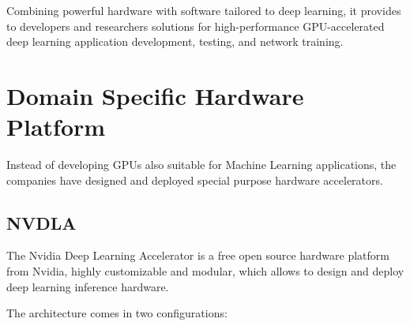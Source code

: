 Combining powerful hardware with software tailored to deep learning, it provides to developers and researchers solutions for high-performance GPU-accelerated deep learning application development, testing, and network training.
\newpage
\section{Domain Specific Hardware Platform}
Instead of developing GPUs also suitable for Machine Learning applications, the companies have designed and deployed special purpose hardware accelerators.
\subsection{NVDLA}
The Nvidia Deep Learning Accelerator is a free open source hardware platform from Nvidia, highly customizable and modular, which allows to design and deploy deep learning inference hardware.

The architecture comes in two configurations:

